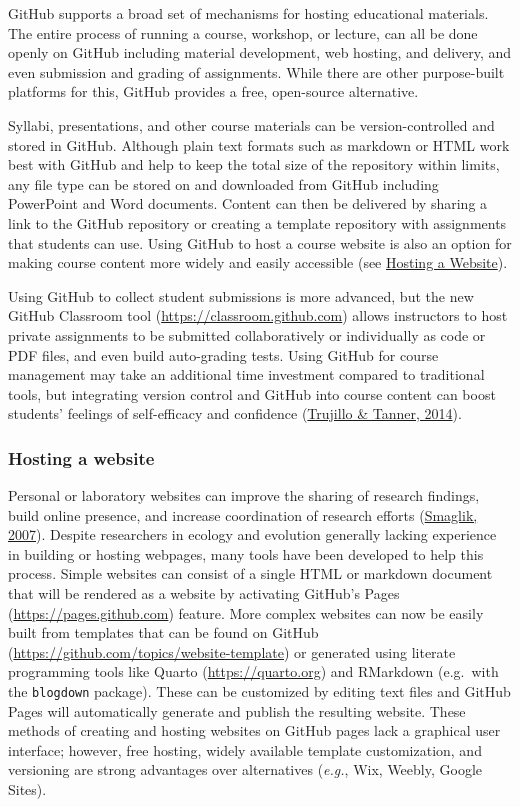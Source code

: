 GitHub supports a broad set of mechanisms for hosting educational materials.
The entire process of running a course, workshop, or lecture, can all be done openly on GitHub including material development, web hosting, and delivery, and even submission and grading of assignments.
While there are other purpose-built platforms for this, GitHub provides a free, open-source alternative.

Syllabi, presentations, and other course materials can be version-controlled and stored in GitHub.
Although plain text formats such as markdown or HTML work best with GitHub and help to keep the total size of the repository within limits, any file type can be stored on and downloaded from GitHub including PowerPoint and Word documents.
Content can then be delivered by sharing a link to the GitHub repository or creating a template repository with assignments that students can use.
Using GitHub to host a course website is also an option for making course content more widely and easily accessible (see \protect\hyperlink{hosting-a-website}{Hosting a Website}).

Using GitHub to collect student submissions is more advanced, but the new GitHub Classroom tool (\url{https://classroom.github.com}) allows instructors to host private assignments to be submitted collaboratively or individually as code or PDF files, and even build auto-grading tests.
Using GitHub for course management may take an additional time investment compared to traditional tools, but integrating version control and GitHub into course content can boost students' feelings of self-efficacy and confidence (\protect\hyperlink{ref-dqrFjoSb}{Trujillo \& Tanner, 2014}).

\hypertarget{hosting-a-website}{%
\subsubsection{Hosting a website}\label{hosting-a-website}}

Personal or laboratory websites can improve the sharing of research findings, build online presence, and increase coordination of research efforts (\protect\hyperlink{ref-HiIPSSHV}{Smaglik, 2007}).
Despite researchers in ecology and evolution generally lacking experience in building or hosting webpages, many tools have been developed to help this process.
Simple websites can consist of a single HTML or markdown document that will be rendered as a website by activating GitHub's Pages (\url{https://pages.github.com}) feature.
More complex websites can now be easily built from templates that can be found on GitHub (\url{https://github.com/topics/website-template}) or generated using literate programming tools like Quarto (\url{https://quarto.org}) and RMarkdown (e.g.~with the \texttt{blogdown} package). These can be customized by editing text files and GitHub Pages will automatically generate and publish the resulting website.
These methods of creating and hosting websites on GitHub pages lack a graphical user interface; however, free hosting, widely available template customization, and versioning are strong advantages over alternatives (\emph{e.g.}, Wix, Weebly, Google Sites).

